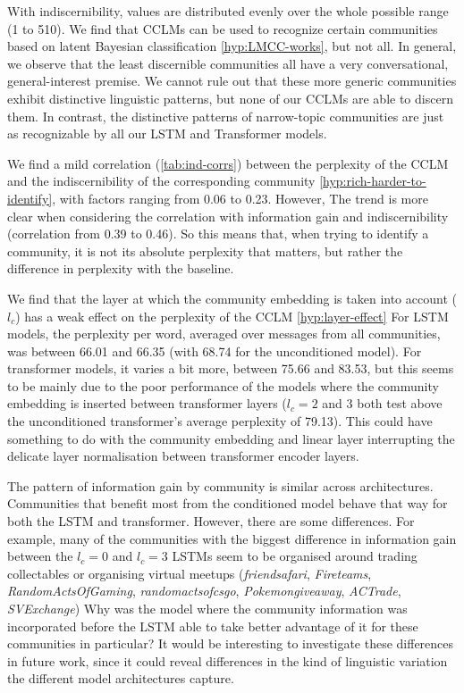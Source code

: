 \documentclass[11pt]{article}
\begin{document}
With indiscernibility, values are distributed evenly over the whole possible
range (1 to 510). We find that CCLMs can be used to recognize certain
communities based on latent Bayesian classification
\ref{hyp:LMCC-works}, but not all.  In general, we observe that the least
discernible communities all have a very conversational, general-interest
premise. We cannot rule out that these more generic
communities exhibit distinctive linguistic patterns, but none of our
CCLMs are able to discern them. In contrast, the distinctive patterns
of narrow-topic communities are just as recognizable by all our LSTM
and Transformer models.

We find a mild correlation (\cref{tab:ind-corrs}) between the
perplexity of the CCLM and the indiscernibility of the corresponding
community \ref{hyp:rich-harder-to-identify}, with factors ranging from
0.06 to 0.23. However, The trend is more clear when considering the
correlation with information gain and indiscernibility (correlation
from 0.39 to 0.46). So this means that, when trying to identify a
community, it is not its absolute perplexity that matters, but rather
the difference in perplexity with the baseline.

We find that the layer at which the community embedding is taken into
account ($l_c$) has a weak effect on the perplexity of the CCLM
\ref{hyp:layer-effect}
For LSTM models, the perplexity per word, averaged over
messages from all communities, was between \num{66.01} and \num{66.35}
(with \num{68.74} for the unconditioned model).
For transformer models, it varies a bit more, between \num{75.66} and \num{83.53},
but this seems to be mainly due to the poor performance of the models where
the community embedding is inserted between transformer layers
($l_c=2$ and $3$ both test above the unconditioned transformer's 
average perplexity of \num{79.13}).
This could have something to do with the community embedding and linear layer
interrupting the delicate layer normalisation between transformer encoder layers.

The pattern of information gain by community is similar across
architectures.  Communities that benefit most from the conditioned
model behave that way for both the LSTM and transformer.  However,
there are some differences.  For example, many of the communities with the biggest 
difference in information gain between the $l_c=0$ and $l_c=3$ LSTMs 
seem to be organised around trading collectables or organising virtual meetups
(\emph{friendsafari},
\emph{Fireteams},
\emph{RandomActsOfGaming},
\emph{randomactsofcsgo},
\emph{Pokemongiveaway},
\emph{ACTrade},
\emph{SVExchange})
Why was the model where the community information was incorporated before
the LSTM able to take better advantage of it for these communities in particular? 
It would be interesting to investigate these differences in future work, since it
could reveal differences in the kind of linguistic variation the
different model architectures capture.
\end{document}
